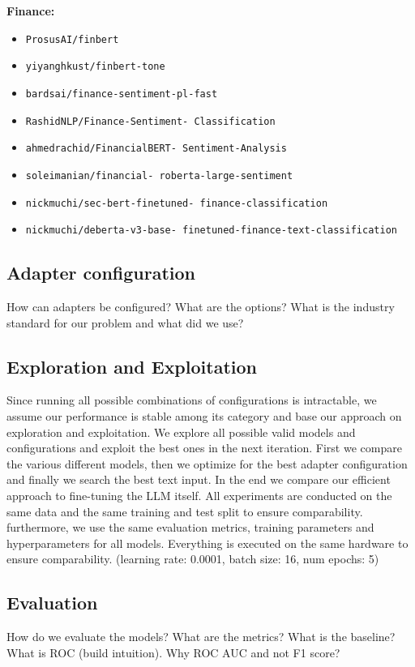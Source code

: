 \documentclass[conference]{IEEEtran}
\begin{document}
\noindent
\textbf{Finance:}
\begin{itemize}
\item \texttt{ProsusAI/finbert}
\item \texttt{yiyanghkust/finbert-tone}
\item \texttt{bardsai/finance-sentiment-pl-fast}
\item \texttt{RashidNLP/Finance-Sentiment- Classification}
\item \texttt{ahmedrachid/FinancialBERT- Sentiment-Analysis}
\item \texttt{soleimanian/financial- roberta-large-sentiment}
\item \texttt{nickmuchi/sec-bert-finetuned- finance-classification}
\item \texttt{nickmuchi/deberta-v3-base- finetuned-finance-text-classification}
\end{itemize}

\subsection{Adapter configuration}%
How can adapters be configured? What are the options? What is the industry standard for our problem and what did we use?
\subsection{Exploration and Exploitation}%
Since running all possible combinations of configurations is intractable, we assume our performance is stable among its category and base our approach on  exploration and exploitation. We explore all possible valid models and configurations and exploit the best ones in the next iteration. First we compare the various different models, then we optimize for the best adapter configuration and finally we search the best text input. In the end we compare our efficient approach to fine-tuning the LLM itself. 
All experiments are conducted on the same data and the same training and test split to ensure comparability. furthermore, we use the same evaluation metrics, training parameters and hyperparameters for all models. Everything is executed on the same hardware to ensure comparability.
(learning rate: 0.0001, batch size: 16,	num epochs: 5)

\subsection{Evaluation} %
How do we evaluate the models? What are the metrics? What is the baseline?
What is ROC (build intuition).
Why ROC AUC and not F1 score?
\end{document}
